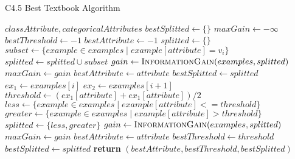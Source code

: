 \begin{algorithm}[H]
\caption{C4.5 Best Textbook Algorithm}\label{a:c45-best-simple}
\begin{algorithmic}[1]
\renewcommand{\algorithmicrequire}{\textbf{Global Vars:}}
\Require $classAttribute, categoricalAttributes$
  \State $bestSplitted \gets \{\}$
  \State $maxGain \gets -\infty$
  \State $bestThreshold \gets -1$
  \State $bestAttribute \gets -1$
      \State $splitted \gets \{\}$
          \State $subset \gets \{example \in examples \mid example[attribute] = v_i\}$
          \State $splitted \gets splitted \cup subset$
        \EndFor
        \State $gain \gets  \textsc{InformationGain}(examples, splitted)$
            \State $maxGain \gets gain$
            \State $bestAttribute \gets attribute$
            \State $bestSplitted \gets splitted$
        \EndIf
    \Else {}
          \State $ex_1 \gets examples[i]$
          \State $ex_2 \gets examples[i+1]$
            \State $threshold \gets (ex_1[attribute] + ex_1[attribute]) / 2$
            \State $less \gets \{example \in examples \mid example[attribute] <= threshold\}$
            \State $greater \gets\{example \in examples \mid example[attribute] > threshold\}$
            \State $splitted \gets \{less, greater\}$
            \State $gain \gets  \textsc{InformationGain}(examples, splitted)$
                \State $maxGain \gets gain$
                \State $bestAttribute \gets attribute$
                \State $bestThreshold \gets threshold$
                \State $bestSplitted \gets splitted$
            \EndIf
          \EndIf
        \EndFor
    \EndIf
  \EndFor
  \State \textbf{return} $(bestAttribute, bestThreshold, bestSplitted)$
\EndProcedure
\end{algorithmic}
\end{algorithm}

